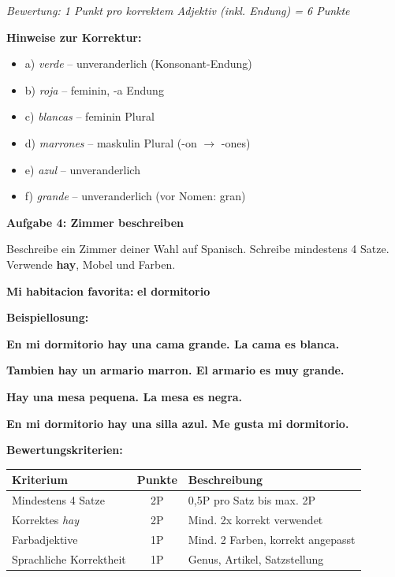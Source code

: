 \documentclass[11pt, a4paper]{article}
\newcommand{\fachfarbe}{spanisch}
\newcommand{\punktebox}[1]{\hfill\fbox{\small \_/#1}}
\newcommand{\loesung}[1]{\textcolor{loesung}{\textbf{#1}}}
\newenvironment{aufgabe}[1]{%
    \needspace{5\baselineskip}%
    \nopagebreak[4]%
    \vspace{10pt}
    \noindent\textbf{\textcolor{\fachfarbe}{Aufgabe #1}}
    \nopagebreak[4]%
    \vspace{5pt}
    \nopagebreak[4]%
    \begin{list}{}{\leftmargin=0pt}
    \item[]
}{%
    \end{list}
}
\newcommand{\es}[1]{\textcolor{\fachfarbe}{\textbf{#1}}}
\begin{document}
\textit{\textcolor{grau}{Bewertung: 1 Punkt pro korrektem Adjektiv (inkl. Endung) = 6 Punkte}}

\textbf{Hinweise zur Korrektur:}
\begin{itemize}
    \item a) \textit{verde} -- unveranderlich (Konsonant-Endung)
    \item b) \textit{roja} -- feminin, -a Endung
    \item c) \textit{blancas} -- feminin Plural
    \item d) \textit{marrones} -- maskulin Plural (-on $\rightarrow$ -ones)
    \item e) \textit{azul} -- unveranderlich
    \item f) \textit{grande} -- unveranderlich (vor Nomen: gran)
\end{itemize}

\vspace{15pt}


\begin{aufgabe}{4: Zimmer beschreiben}
Beschreibe ein Zimmer deiner Wahl auf Spanisch. Schreibe mindestens 4 Satze. Verwende \es{hay}, Mobel und Farben. \punktebox{6}
\end{aufgabe}

\noindent\textbf{Mi habitacion favorita:} \loesung{el dormitorio}

\textbf{Beispiellosung:}

\loesung{En mi dormitorio hay una cama grande. La cama es blanca.}

\loesung{Tambien hay un armario marron. El armario es muy grande.}

\loesung{Hay una mesa pequena. La mesa es negra.}

\loesung{En mi dormitorio hay una silla azul. Me gusta mi dormitorio.}

\vspace{1em}

\textbf{Bewertungskriterien:}

\begin{tabular}{|l|c|p{8cm}|}
\hline
\textbf{Kriterium} & \textbf{Punkte} & \textbf{Beschreibung} \\
\hline
Mindestens 4 Satze & 2P & 0,5P pro Satz bis max. 2P \\
\hline
Korrektes \textit{hay} & 2P & Mind. 2x korrekt verwendet \\
\hline
Farbadjektive & 1P & Mind. 2 Farben, korrekt angepasst \\
\hline
Sprachliche Korrektheit & 1P & Genus, Artikel, Satzstellung \\
\hline
\end{tabular}
\end{document}
